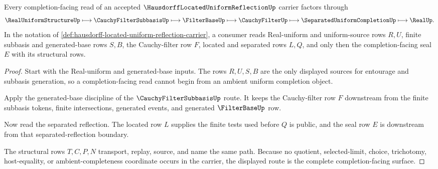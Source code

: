 \begin{theorem}
\label{thm:hausdorff-located-uniform-reflection-completion-route}
Every completion-facing read of an accepted $\HausdorffLocatedUniformReflectionUp$ carrier factors through
$$
\RealUniformStructureUp \longmapsto \CauchyFilterSubbasisUp \longmapsto \FilterBaseUp \longmapsto \CauchyFilterUp \longmapsto \SeparatedUniformCompletionUp \longmapsto \RealUp .
$$
In the notation of \autoref{def:hausdorff-located-uniform-reflection-carrier}, a consumer reads Real-uniform and uniform-source rows $R,U$, finite subbasis and generated-base rows $S,B$, the Cauchy-filter row $F$, located and separated rows $L,Q$, and only then the completion-facing seal $E$ with its structural rows.
\end{theorem}
\begin{proof}
Start with the Real-uniform and generated-base inputs. The rows $R,U,S,B$ are the only displayed sources for entourage and subbasis generation, so a completion-facing read cannot begin from an ambient uniform completion object.

Apply the generated-base discipline of the $\CauchyFilterSubbasisUp$ route. It keeps the Cauchy-filter row $F$ downstream from the finite subbasis tokens, finite intersections, generated events, and generated $\FilterBaseUp$ row.

Now read the separated reflection. The located row $L$ supplies the finite tests used before $Q$ is public, and the seal row $E$ is downstream from that separated-reflection boundary.

The structural rows $T,C,P,N$ transport, replay, source, and name the same path. Because no quotient, selected-limit, choice, trichotomy, host-equality, or ambient-completeness coordinate occurs in the carrier, the displayed route is the complete completion-facing surface.
\end{proof}

